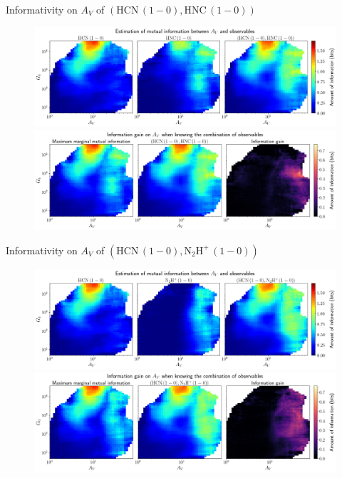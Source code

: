 \documentclass{beamer}
\begin{document}
\begin{frame}{Informativity on $A_V$ of $\left(\mathrm{HCN\,(1-0)},\mathrm{HNC\,(1-0)}\right)$}
    \begin{figure}
        \centering
        \includegraphics[width=0.95\linewidth]{../mi/av__hcn10_hnc10_mi.png}
        \vfill
        \includegraphics[width=0.95\linewidth]{../mi/av__hcn10_hnc10_mi_gain.png}
    \end{figure}
\end{frame}

\begin{frame}{Informativity on $A_V$ of $\left(\mathrm{HCN\,(1-0)},\mathrm{N_2H^+\,(1-0)}\right)$}
    \begin{figure}
        \centering
        \includegraphics[width=0.95\linewidth]{../mi/av__hcn10_n2hp10_mi.png}
        \vfill
        \includegraphics[width=0.95\linewidth]{../mi/av__hcn10_n2hp10_mi_gain.png}
    \end{figure}
\end{frame}
\end{document}
